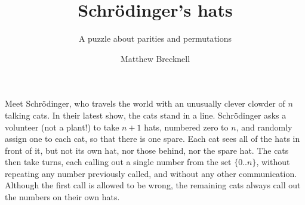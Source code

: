 \documentclass[10pt,a4paper]{scrartcl}
\begin{document}
\title{Schr\"odinger's hats}
\subtitle{A puzzle about parities and permutations}
\author{Matthew Brecknell}

\maketitle

Meet Schr\"odinger, who travels the world with an unusually clever clowder of
$n$ talking cats. In their latest show, the cats stand in a line.
Schr\"odinger asks a volunteer (not a plant!) to take $n+1$ hats, numbered zero
to $n$, and randomly assign one to each cat, so that there is one spare.  Each
cat sees all of the hats in front of it, but not its own hat, nor those behind,
nor the spare hat. The cats then take turns, each calling out a single number
from the set $\{0..n\}$, without repeating any number previously called, and
without any other communication. Although the first call is allowed to be
wrong, the remaining cats always call out the numbers on their own hats.


\end{document}
